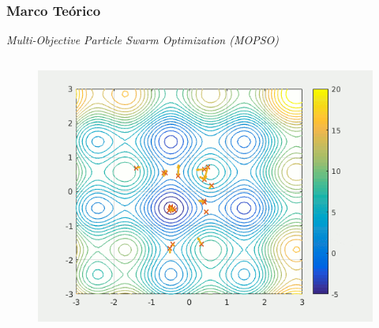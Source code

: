 \documentclass[usenames,dvipsnames]{beamer}
\begin{document}
\begin{frame}
\frametitle{Marco Teórico} 
\begin{exampleblock}{\textit{Multi-Objective Particle Swarm Optimization (MOPSO)}}

\end{exampleblock}
\vspace{-0.5cm}
\begin{columns}[t]
\begin{column}{.45\textwidth}
\begin{figure}[H]
\centering
    
    \includegraphics[width=\textwidth]{./graphics/ejemplopso/capas-95.png}
    

\end{figure}
\end{column}
\end{columns}
\end{frame}
\end{document}
